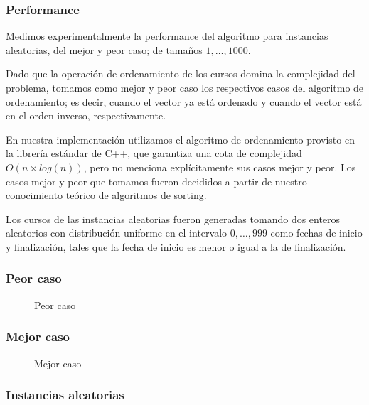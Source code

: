 \documentclass[a4paper, 10pt, twoside]{article}
\newcommand{\tresgraficos}[3]{
    \newcommand{\separacion}{-2.2em}
    \vspace{\separacion}
    
    \vspace{\separacion}
    
    \vspace{\separacion}
    
}
\begin{document}
\subsubsection{Performance}
Medimos experimentalmente la performance del algoritmo para instancias aleatorias, del mejor y peor caso; de tamaños $1, \ldots, 1000$.

Dado que la operación de ordenamiento de los cursos domina la complejidad del problema, tomamos como mejor y peor caso los respectivos casos del algoritmo de ordenamiento; es decir, cuando el vector ya está ordenado y cuando el vector está en el orden inverso, respectivamente.

En nuestra implementación utilizamos el algoritmo de ordenamiento provisto en la librería estándar de C++, que garantiza una cota de complejidad $O(n \times log(n))$, pero no menciona explícitamente sus casos mejor y peor. Los casos mejor y peor que tomamos fueron decididos a partir de nuestro conocimiento teórico de algoritmos de sorting.

Los cursos de las instancias aleatorias fueron generadas tomando dos enteros aleatorios con distribución uniforme en el intervalo $0, \ldots, 999$ como fechas de inicio y finalización, tales que la fecha de inicio es menor o igual a la de finalización.

\subsubsection{Peor caso}

\begin{figure}[H]
  \centering
  \tresgraficos{problema2-peor-caso}
               {problema2-peor-caso-logn}
               {problema2-peor-caso-n}               
  \caption{Peor caso}
\end{figure}


\subsubsection{Mejor caso}

\begin{figure}[H]
  \centering
  \tresgraficos{problema2-mejor-caso}
               {problema2-mejor-caso-logn}
               {problema2-mejor-caso-n}
  \caption{Mejor caso}
\end{figure}


\subsubsection{Instancias aleatorias}
\end{document}
